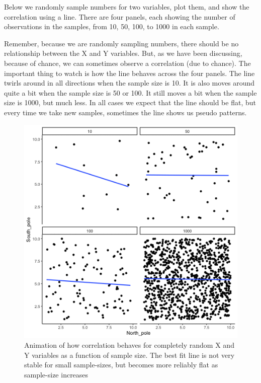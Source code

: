 \documentclass[
]{book}
\begin{document}
Below we randomly sample numbers for two variables, plot them, and show the correlation using a line. There are four panels, each showing the number of observations in the samples, from 10, 50, 100, to 1000 in each sample.

Remember, because we are randomly sampling numbers, there should be no relationship between the X and Y variables. But, as we have been discussing, because of chance, we can sometimes observe a correlation (due to chance). The important thing to watch is how the line behaves across the four panels. The line twirls around in all directions when the sample size is 10. It is also moves around quite a bit when the sample size is 50 or 100. It still moves a bit when the sample size is 1000, but much less. In all cases we expect that the line should be flat, but every time we take new samples, sometimes the line shows us pseudo patterns.

\begin{figure}
\centering
\includegraphics{gifs/corUnifFourNs-1.gif}
\caption{\label{fig:3corRandfour}Animation of how correlation behaves for completely random X and Y variables as a function of sample size. The best fit line is not very stable for small sample-sizes, but becomes more reliably flat as sample-size increases}
\end{figure}
\end{document}
